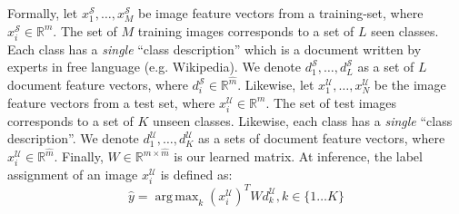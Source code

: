 \documentclass[11pt,a4paper]{article}
\DeclareMathOperator*{\argmax}{arg\,max}
\newcommand\gal[1]{\textcolor{bright}{\textbf{GAL:} #1 }}
\newcommand\yuval[1]{\textcolor{darkpink}{\textbf{YUVAL:} #1 }}
\begin{document}
Formally, let $x^{\mathcal{S}}_1,\ldots,x^{\mathcal{S}}_{M}$ be image feature vectors from a training-set, where $x^{\mathcal{S}}_i\in \mathbb{R}^{m}$. The set of $M$ training images corresponds to a set of $L$ seen classes. Each class has a \textit{single} \enquote{class description} which is a document written by experts in free language (e.g. Wikipedia). We denote $d^{\mathcal{S}}_1,\ldots,d^{\mathcal{S}}_{L}$ as a set of $L$ document feature vectors, 
where $d^{\mathcal{S}}_i\in \mathbb{R}^{\hat{m}}$.
Likewise, let $x^{\mathcal{U}}_1,\ldots,x^{\mathcal{U}}_{N}$ be the image feature vectors from a test set, where $x^{\mathcal{U}}_i\in \mathbb{R}^{m}$. The set of test images corresponds to a set of $K$ unseen classes. Likewise, each class has a \textit{single} \enquote{class description}. We denote $d^{\mathcal{U}}_1,\ldots,d^{\mathcal{U}}_{K}$ as a sets of document feature vectors, 
where $x^{\mathcal{U}}_i\in \mathbb{R}^{\hat{m}}$.
Finally, \(W\in \mathbb{R}^{m\times\hat{m}}\) is our learned matrix.
At inference, the label assignment of
an image $x_i^{\mathcal{U}}$ is defined as:
\begin{equation}
  \label{equation:attention}
  {\hat{y}}=\argmax_{k} \left( x_i^{\mathcal{U}} \right) ^{T}Wd^{\mathcal{U}}_{k}, k \in \{1 \dots K\}
\end{equation}




\end{document}
